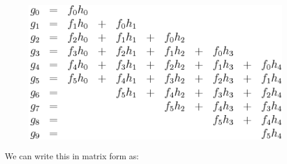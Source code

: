 \begin{figure}[H]
\centering
\includegraphics[scale=.6]{graphics/7f867e9ec901e62d2c8efa1ec9b4c5d6.png}
\end{figure}

We can write this in matrix form as:

